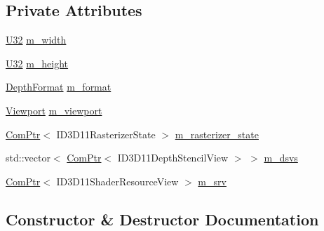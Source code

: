 \subsection*{Private Attributes}
\begin{DoxyCompactItemize}
\item 
\hyperlink{namespacemage_a41c104c036fba3756a74e19f793eeaa1}{U32} \hyperlink{structmage_1_1_shadow_map_buffer_ac8c9e5e52c31c9d358e4bb0f306439a6}{m\+\_\+width}
\item 
\hyperlink{namespacemage_a41c104c036fba3756a74e19f793eeaa1}{U32} \hyperlink{structmage_1_1_shadow_map_buffer_a4e4048bd48e7cd347729f1a675a73ed3}{m\+\_\+height}
\item 
\hyperlink{namespacemage_a5446ec2e6bddf310216a1640c26576d3}{Depth\+Format} \hyperlink{structmage_1_1_shadow_map_buffer_a84ec323bfc88313547f21051b2b70637}{m\+\_\+format}
\item 
\hyperlink{classmage_1_1_viewport}{Viewport} \hyperlink{structmage_1_1_shadow_map_buffer_a5dd4126af774f674f69280f53dd8393d}{m\+\_\+viewport}
\item 
\hyperlink{namespacemage_ae74f374780900893caa5555d1031fd79}{Com\+Ptr}$<$ I\+D3\+D11\+Rasterizer\+State $>$ \hyperlink{structmage_1_1_shadow_map_buffer_a46cf9e88e20431629f6622e3647fd58b}{m\+\_\+rasterizer\+\_\+state}
\item 
std\+::vector$<$ \hyperlink{namespacemage_ae74f374780900893caa5555d1031fd79}{Com\+Ptr}$<$ I\+D3\+D11\+Depth\+Stencil\+View $>$ $>$ \hyperlink{structmage_1_1_shadow_map_buffer_a36cb430d4da5bd380e66cf68bb0522c1}{m\+\_\+dsvs}
\item 
\hyperlink{namespacemage_ae74f374780900893caa5555d1031fd79}{Com\+Ptr}$<$ I\+D3\+D11\+Shader\+Resource\+View $>$ \hyperlink{structmage_1_1_shadow_map_buffer_af313b37ddc41f91e949d015086f6ba18}{m\+\_\+srv}
\end{DoxyCompactItemize}


\subsection{Constructor \& Destructor Documentation}
\hypertarget{structmage_1_1_shadow_map_buffer_af10514b30b6f513fb5338662465cc704}{}\label{structmage_1_1_shadow_map_buffer_af10514b30b6f513fb5338662465cc704} 
